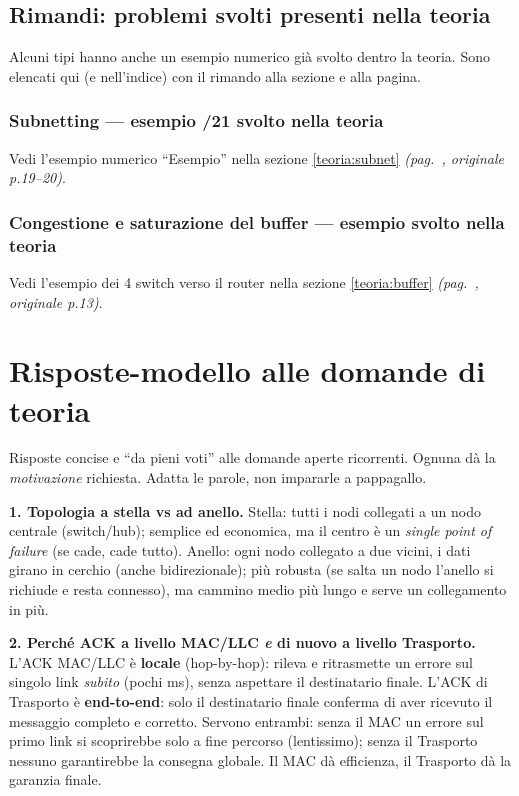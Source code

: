 \documentclass[11pt,a4paper]{report}
\begin{document}
\section{Rimandi: problemi svolti presenti nella teoria}
Alcuni tipi hanno anche un esempio numerico già svolto dentro la teoria. Sono elencati qui (e nell'indice) con il rimando alla sezione e alla pagina.
\subsection{Subnetting --- esempio /21 svolto nella teoria}
Vedi l'esempio numerico ``Esempio'' nella sezione \ref{teoria:subnet} \emph{(pag.~\pageref{teoria:subnet}, originale p.19--20)}.
\subsection{Congestione e saturazione del buffer --- esempio svolto nella teoria}
Vedi l'esempio dei 4 switch verso il router nella sezione \ref{teoria:buffer} \emph{(pag.~\pageref{teoria:buffer}, originale p.13)}.

\chapter{Risposte-modello alle domande di teoria}
Risposte concise e ``da pieni voti'' alle domande aperte ricorrenti. Ognuna dà
la \emph{motivazione} richiesta. Adatta le parole, non impararle a pappagallo.

\textbf{1. Topologia a stella vs ad anello.} Stella: tutti i nodi collegati a un
nodo centrale (switch/hub); semplice ed economica, ma il centro è un
\emph{single point of failure} (se cade, cade tutto). Anello: ogni nodo collegato
a due vicini, i dati girano in cerchio (anche bidirezionale); più robusta (se
salta un nodo l'anello si richiude e resta connesso), ma cammino medio più lungo
e serve un collegamento in più.

\textbf{2. Perché ACK a livello MAC/LLC \emph{e} di nuovo a livello Trasporto.}
L'ACK MAC/LLC è \textbf{locale} (hop-by-hop): rileva e ritrasmette un errore sul
singolo link \emph{subito} (pochi ms), senza aspettare il destinatario finale.
L'ACK di Trasporto è \textbf{end-to-end}: solo il destinatario finale conferma di
aver ricevuto il messaggio completo e corretto. Servono entrambi: senza il MAC un
errore sul primo link si scoprirebbe solo a fine percorso (lentissimo); senza il
Trasporto nessuno garantirebbe la consegna globale. Il MAC dà efficienza, il
Trasporto dà la garanzia finale.
\end{document}
